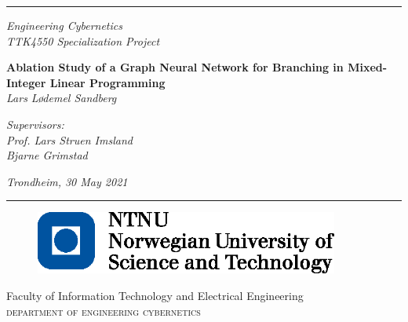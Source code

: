 \pagestyle{empty}
\newcommand{\HRule}{\rule{\linewidth}{1mm}}
 
\vspace*{-3.5cm}
\noindent\HRule
\begin{center}
 
\end{center}
\begin{center}
  \huge
	\large
	\noindent\emph{Engineering Cybernetics\\TTK4550 Specialization Project}
\end{center}
\begin{center}
 
\end{center}
\begin{center}
	\huge
	\noindent\emph{}
  \huge
  \Large
  \noindent \textbf{Ablation Study of a Graph Neural Network for Branching in Mixed-Integer Linear Programming}
  \\ [7mm]
  \large
  \noindent\emph{Lars Lødemel Sandberg}
\end{center}
\begin{center}
  \huge
  \large
  \noindent\emph{Supervisors:\\ Prof. Lars Struen Imsland \\ Bjarne Grimstad}
\end{center}
\begin{center}
	\large
	\noindent \emph{Trondheim, 30 May 2021}
\end{center}
\noindent\HRule
{}
\begin{figure}[h]
	\begin{center}
		\includegraphics[angle=0, width=10cm]{img/logo_ntnu}
	\end{center}
	\label{fig:logo}
\end{figure}
 
\begin{minipage}[c]{\textwidth}
	{\setlength{\baselineskip}{0.5\baselineskip}
	\small \noindent Faculty of Information Technology and Electrical Engineering\\
	\Large \noindent \textsc{department of engineering cybernetics}}
\end{minipage}

